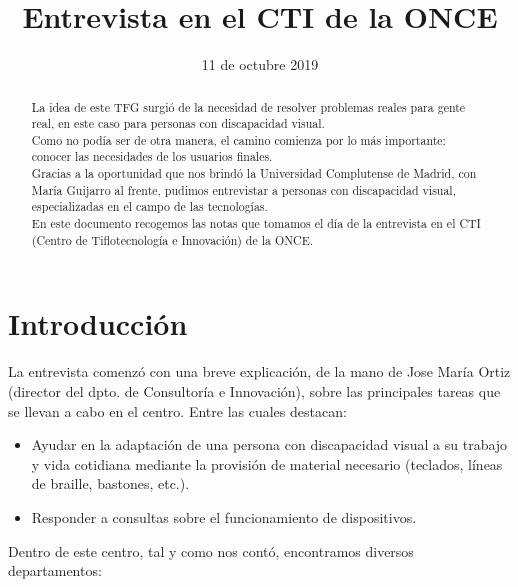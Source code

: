 \documentclass{article}
\title{\Huge Entrevista en el CTI de la ONCE}
\date{11 de octubre 2019}
\begin{document}
	\begin{titlepage}
		\maketitle
		\thispagestyle{empty}
	\end{titlepage}

	\begin{abstract}
		La idea de este TFG surgió de la necesidad de resolver problemas reales para gente real, en este caso para personas con discapacidad visual.
		\\
		Como no podía ser de otra manera, el camino comienza por lo más importante: conocer las necesidades de los usuarios finales.
		\\
		Gracias a la oportunidad que nos  brindó la Universidad Complutense de Madrid, con María Guijarro al frente, pudimos entrevistar a personas con discapacidad visual, especializadas en el campo de las tecnologías.
		\\
		En este documento recogemos las notas que tomamos el día de la entrevista en el CTI (Centro de Tiflotecnología e Innovación)  de la ONCE.

	\end{abstract}

	\section{Introducción}

	La entrevista comenzó con una breve explicación, de la mano de Jose María Ortiz (director del dpto. de Consultoría e Innovación), sobre las principales tareas que se llevan a cabo en el centro. Entre las cuales destacan:

	 \begin{itemize}
		\item Ayudar en la adaptación  de una persona con discapacidad visual a su trabajo y vida cotidiana mediante la provisión de material necesario (teclados, líneas de braille, bastones, etc.).
		\item Responder a consultas sobre el funcionamiento de dispositivos.
	\end{itemize}

	Dentro de este centro, tal y como nos contó, encontramos diversos departamentos:
\end{document}
